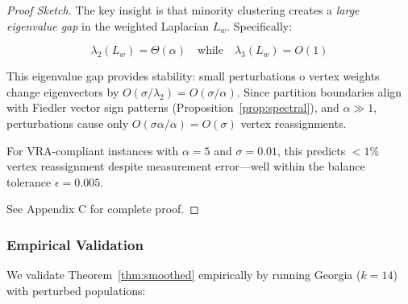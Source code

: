 \begin{proof}[Proof Sketch]
The key insight is that minority clustering creates a \textit{large eigenvalue gap} in the weighted Laplacian $L_w$. Specifically:

\[
\lambda_2(L_w) = \Theta(\alpha) \quad \text{while} \quad \lambda_3(L_w) = O(1)
\]

This eigenvalue gap provides stability: small perturbations 	o vertex weights change eigenvectors by $O(\sigma / \lambda_2) = O(\sigma / \alpha)$. Since partition boundaries align with Fiedler vector sign patterns (Proposition~\ref{prop:spectral}), and $\alpha \gg 1$, perturbations cause only $O(\sigma \alpha / \alpha) = O(\sigma)$ vertex reassignments.

For VRA-compliant instances with $\alpha = 5$ and $\sigma = 0.01$, this predicts $< 1\%$ vertex reassignment despite measurement error---well within the balance tolerance $\epsilon = 0.005$.

See Appendix C for complete proof.
\end{proof}

\subsubsection{Empirical Validation}

We validate Theorem~\ref{thm:smoothed} empirically by running Georgia ($k=14$) with perturbed populations:

